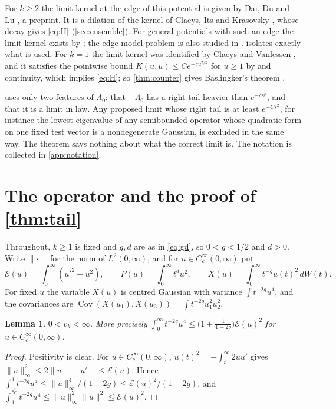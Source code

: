 \documentclass[11pt]{article}
\newtheorem{lemma}[theorem]{Lemma}
\theoremstyle{remark}
\begin{document}
For $k\ge2$ the limit kernel at the edge of this potential is given by Dai, Du and Lu \cite[Theorem~1.9]{DDL}, a
preprint. It is a dilation of the kernel of Claeys, Its and Krasovsky \cite{CIK}, whose decay \cite[(1.23)]{CIK} gives
\eqref{eq:H} (\cref{sec:ensemble}). For general potentials with such an edge the limit kernel exists by
\cite[Proposition~1.7 and Appendix~B]{CKLW}; the edge model problem is also studied in \cite{Atkin}.
 isolates exactly what is used. For $k=1$ the limit kernel was identified
by Claeys and Vanlessen \cite{CV}, and it satisfies the pointwise bound $K(u,u)\le Ce^{-cu^{7/2}}$ for $u\ge1$ by
\cite[(1.23)]{CIK} and continuity, which implies \eqref{eq:H}; so \cref{thm:counter} gives Baslingker's theorem \cite[Theorem~4]{Bas}.

 uses only two features of $\Lambda_0$: that $-\Lambda_0$ has a right tail heavier than
$e^{-cs^{p}}$, and that it is a limit in law. Any proposed limit whose right tail is at least $e^{-Cs^2}$, for instance
the lowest eigenvalue of any semibounded operator whose quadratic form on one fixed test vector is a nondegenerate
Gaussian, is excluded in the same way. The theorem says nothing about what the correct limit is. The notation is collected in \cref{app:notation}.

\section{The operator and the proof of \texorpdfstring{\cref{thm:tail}}{Theorem 1.1}}\label{sec:operator}

Throughout, $k\ge1$ is fixed and $g,d$ are as in \eqref{eq:gd}, so $0<g<1/2$ and $d>0$. Write $\|\cdot\|$ for the norm
of $L^2(0,\infty)$, and for $u\in C_c^\infty(0,\infty)$ put
\[
\mathcal E(u)=\int_0^\infty(u'^2+u^2),\qquad P(u)=\int_0^\infty t^d u^2,\qquad X(u)=\int_0^\infty t^{-g}u(t)^2\,dW(t).
\]
For fixed $u$ the variable $X(u)$ is centred Gaussian with variance $\int t^{-2g}u^4$, and the covariances are
$\operatorname{Cov}(X(u_1),X(u_2))=\int t^{-2g}u_1^2u_2^2$.

\begin{lemma}\label{lem:vk}
$0<v_k<\infty$. More precisely $\int_0^\infty t^{-2g}u^4\le\bigl(1+\frac{1}{1-2g}\bigr)\mathcal E(u)^2$ for
$u\in C_c^\infty(0,\infty)$.
\end{lemma}

\begin{proof}
Positivity is clear. For $u\in C_c^\infty(0,\infty)$, $u(t)^2=-\int_t^\infty 2uu'$ gives
$\|u\|_\infty^2\le2\|u\|\,\|u'\|\le \mathcal E(u)$. Hence
$\int_0^1t^{-2g}u^4\le\|u\|_\infty^4/(1-2g)\le \mathcal E(u)^2/(1-2g)$, and
$\int_1^\infty t^{-2g}u^4\le\|u\|_\infty^2\|u\|^2\le \mathcal E(u)^2$.
\end{proof}
\end{document}
